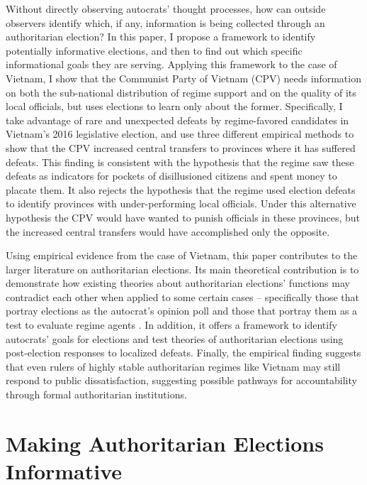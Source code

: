 \documentclass[12pt]{article}
\newcommand{\1}{\mathbbm{1}}
\begin{document}
Without directly observing autocrats' thought processes, how can outside observers identify which, if any, information is being collected through an authoritarian election? In this paper, I propose a framework to identify potentially informative elections, and then to find out which specific informational goals they are serving. Applying this framework to the case of Vietnam, I show that the Communist Party of Vietnam (CPV) needs information on both the sub-national distribution of regime support and on the quality of its local officials, but uses elections to learn only about the former. Specifically, I take advantage of rare and unexpected defeats by regime-favored candidates in Vietnam's 2016 legislative election, and use three different empirical methods to show that the CPV increased central transfers to provinces where it has suffered defeats. This finding is consistent with the hypothesis that the regime saw these defeats as indicators for pockets of disillusioned citizens and spent money to placate them. It also rejects the hypothesis that the regime used election defeats to identify provinces with under-performing local officials. Under this alternative hypothesis the CPV would have wanted to punish officials in these provinces, but the increased central transfers would have accomplished only the opposite.

Using empirical evidence from the case of Vietnam, this paper contributes to the larger literature on authoritarian elections. Its main theoretical contribution is to demonstrate how existing theories about authoritarian elections' functions may contradict each other when applied to some certain cases -- specifically those that portray elections as the autocrat's opinion poll \citep[e.g.][]{Miller2015, Magaloni2006, Blaydes2010} and those that portray them as a test to evaluate regime agents \citep[e.g.][]{Magaloni2006, Blaydes2010,Myagkov2009,RundlettSvolik2016}. In addition, it offers a framework to identify autocrats' goals for elections and test theories of authoritarian elections using post-election responses to localized defeats. Finally, the empirical finding suggests that even rulers of highly stable authoritarian regimes like Vietnam may still respond to public dissatisfaction, suggesting possible pathways for accountability through formal authoritarian institutions.


\section{Making Authoritarian Elections Informative}
\label{sec:lit_review}
\end{document}
